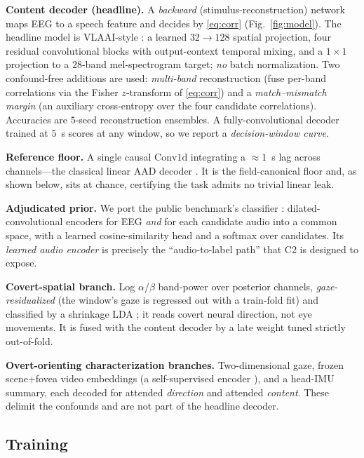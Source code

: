 \documentclass[journal]{IEEEtran}
\begin{document}
\textbf{Content decoder (headline).} A \emph{backward} (stimulus-reconstruction)
network maps EEG to a speech feature and decides by \eqref{eq:corr} (Fig.~\ref{fig:model}).
The headline model is VLAAI-style \cite{accou2023vlaai}: a learned $32\!\to\!128$ spatial
projection, four residual convolutional blocks with output-context temporal mixing,
and a $1{\times}1$ projection to a $28$-band mel-spectrogram target; \emph{no}
batch normalization. Two confound-free additions are used: \emph{multi-band}
reconstruction (fuse per-band correlations via the Fisher $z$-transform of
\eqref{eq:corr}) and a \emph{match--mismatch margin} (an auxiliary cross-entropy
over the four candidate correlations). Accuracies are $5$-seed reconstruction
ensembles. A fully-convolutional decoder trained at $5$~s scores at any window, so
we report a \emph{decision-window curve}.

\textbf{Reference floor.} A single causal $\mathrm{Conv1d}$ integrating a
$\approx\!1$~s lag across channels---the classical linear AAD decoder
\cite{osullivan2015,wong2018,fuglsang2017}. It is the field-canonical floor and, as
shown below, sits at chance, certifying the task admits no trivial linear leak.

\textbf{Adjudicated prior.} We port the public benchmark's classifier
\cite{maestro}: dilated-convolutional encoders for EEG \emph{and} for each candidate
audio into a common space, with a learned cosine-similarity head and a softmax over
candidates. Its \emph{learned audio encoder} is precisely the ``audio-to-label
path'' that C2 is designed to expose.

\textbf{Covert-spatial branch.} Log $\alpha$/$\beta$ band-power over posterior
channels, \emph{gaze-residualized} (the window's gaze is regressed out with a
train-fold fit) and classified by a shrinkage LDA \cite{ledoit2004}; it reads covert
neural direction, not eye movements. It is fused with the content decoder by a late
weight tuned strictly out-of-fold.

\textbf{Overt-orienting characterization branches.} Two-dimensional gaze, frozen
scene+fovea video embeddings (a self-supervised encoder \cite{vjepa2}), and a head-IMU
summary, each decoded for attended \emph{direction} and attended \emph{content}.
These delimit the confounds and are not part of the headline decoder.

\subsection{Training}
\label{sec:bench-training}
\end{document}
